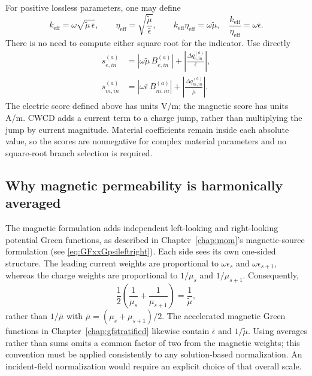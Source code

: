 For positive lossless parameters, one may define
\begin{equation}
  k_{\text{eff}} = \omega\sqrt{\tilde{\mu}\,\bar{\epsilon}},\qquad
  \eta_{\text{eff}}= \sqrt{\frac{\tilde{\mu}}{\bar{\epsilon}}},\qquad
  k_{\text{eff}} \eta_{\text{eff}} = \omega\tilde{\mu},\quad
 \frac{k_{\text{eff}}}{\eta_{\text{eff}}} = \omega \bar{\epsilon}.
 \label{eq:amr-effective-k-eta}
\end{equation}
There is no need to compute either square root for the indicator. Use directly
\begin{align}
  s_{e,in}^{(a)} &=
                   \left|\omega\tilde{\mu}\,B_{e,in}^{(a)}\right|
                   + \left|\frac{\Delta q_{e,in}^{(a)}}{\bar{\epsilon}}\right|,
                   \label{eq:amr-electric-score} \\
  s_{m,in}^{(a)} &=
                   \left|\omega\bar{\epsilon}\,B_{m,in}^{(a)}\right|
                   +\left|\frac{\Delta q_{m,in}^{(a)}}{\tilde{\mu}}\right|.
                   \label{eq:amr-magnetic-score}
\end{align}
The electric score defined above has units \unit{V/m}; the magnetic score has units \unit{A/m}.
CWCD adds a current term to a charge jump, rather than multiplying the jump by
current magnitude. Material coefficients remain inside each absolute value,
so the scores are nonnegative for complex material parameters and no
square-root branch selection is required.

\subsection{Why magnetic permeability is harmonically averaged}
The magnetic formulation adds independent left-looking and right-looking
potential Green functions, as described in Chapter~\ref{chap:mom}'s magnetic-source
formulation (see \eqref{eq:GFxxGpsileftright}). Each side sees
its own one-sided structure. The leading current weights are proportional to
$\omega\epsilon_s$ and $\omega\epsilon_{s+1}$, whereas the charge weights are
proportional to $1/\mu_s$ and $1/\mu_{s+1}$. Consequently,
\begin{equation}
 \frac12 \left(\frac{1}{\mu_s}+\frac{1}{\mu_{s+1}}\right)
  = \frac{1}{\tilde{\mu}},
 \label{eq:amr-reciprocal-mu}
\end{equation}
rather than $1/\bar{\mu}$ with $\bar{\mu}=(\mu_s+\mu_{s+1})/2$. The accelerated
magnetic Green functions in Chapter~\ref{chap:gfstratified} likewise contain $\bar{\epsilon}$ and
$1/\tilde{\mu}$. Using averages rather than sums omits a common factor
of two from the magnetic weights; this convention must be applied consistently
to any solution-based normalization. An incident-field normalization would
require an explicit choice of that overall scale.

